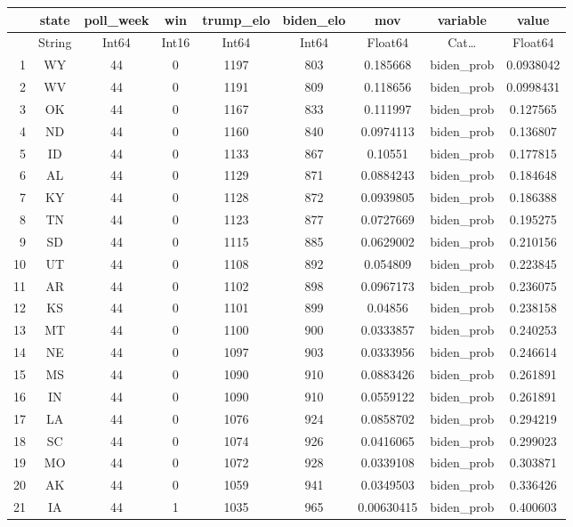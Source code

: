 \documentclass[12pt,a4paper]{article}
\begin{document}
\begin{tabular}{r|cccccccc}
	& state & poll\_week & win & trump\_elo & biden\_elo & mov & variable & value\\
	\hline
	& String & Int64 & Int16 & Int64 & Int64 & Float64 & Cat… & Float64\\
	\hline
	1 & WY & 44 & 0 & 1197 & 803 & 0.185668 & biden\_prob & 0.0938042 \\
	2 & WV & 44 & 0 & 1191 & 809 & 0.118656 & biden\_prob & 0.0998431 \\
	3 & OK & 44 & 0 & 1167 & 833 & 0.111997 & biden\_prob & 0.127565 \\
	4 & ND & 44 & 0 & 1160 & 840 & 0.0974113 & biden\_prob & 0.136807 \\
	5 & ID & 44 & 0 & 1133 & 867 & 0.10551 & biden\_prob & 0.177815 \\
	6 & AL & 44 & 0 & 1129 & 871 & 0.0884243 & biden\_prob & 0.184648 \\
	7 & KY & 44 & 0 & 1128 & 872 & 0.0939805 & biden\_prob & 0.186388 \\
	8 & TN & 44 & 0 & 1123 & 877 & 0.0727669 & biden\_prob & 0.195275 \\
	9 & SD & 44 & 0 & 1115 & 885 & 0.0629002 & biden\_prob & 0.210156 \\
	10 & UT & 44 & 0 & 1108 & 892 & 0.054809 & biden\_prob & 0.223845 \\
	11 & AR & 44 & 0 & 1102 & 898 & 0.0967173 & biden\_prob & 0.236075 \\
	12 & KS & 44 & 0 & 1101 & 899 & 0.04856 & biden\_prob & 0.238158 \\
	13 & MT & 44 & 0 & 1100 & 900 & 0.0333857 & biden\_prob & 0.240253 \\
	14 & NE & 44 & 0 & 1097 & 903 & 0.0333956 & biden\_prob & 0.246614 \\
	15 & MS & 44 & 0 & 1090 & 910 & 0.0883426 & biden\_prob & 0.261891 \\
	16 & IN & 44 & 0 & 1090 & 910 & 0.0559122 & biden\_prob & 0.261891 \\
	17 & LA & 44 & 0 & 1076 & 924 & 0.0858702 & biden\_prob & 0.294219 \\
	18 & SC & 44 & 0 & 1074 & 926 & 0.0416065 & biden\_prob & 0.299023 \\
	19 & MO & 44 & 0 & 1072 & 928 & 0.0339108 & biden\_prob & 0.303871 \\
	20 & AK & 44 & 0 & 1059 & 941 & 0.0349503 & biden\_prob & 0.336426 \\
	21 & IA & 44 & 1 & 1035 & 965 & 0.00630415 & biden\_prob & 0.400603 \\

\end{tabular}
\end{document}
